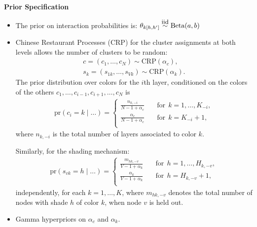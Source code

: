 \documentclass[a1,portrait,final]{a0poster}
\newenvironment{poster}{
  \begin{center}
  \begin{minipage}[c]{0.98\textwidth}
}{
  \end{minipage}
  \end{center}
}
\begin{document}
\begin{poster}
\begin{multicols}{2}
\vspace{0.2cm}

\begin{center}
\textbf{Prior Specification}
\end{center}

\begin{itemize}
 \item The prior on interaction probabilities is:
 $ \theta_{k[h,h']} \stackrel{{\small{\mbox{iid}}}}{\sim} \mbox{Beta}(a,b)$

 \vspace{.2cm}

 \item Chinese Restaurant Processes (CRP) for the cluster assignments at both levels allows the number of clusters to be random:
 \begin{align*}
c=(c_1,\ldots,c_N) \sim \mbox{CRP}(\alpha_c),\\
s_{k}=(s_{1k}, \ldots, s_{Vk})\sim \mbox{CRP}(\alpha_k).
\end{align*}
The prior distribution over colors for the $i$th layer, conditioned on the colors of the others $c_1,\ldots ,c_{i-1},c_{i+1}, \ldots, c_{N}$ is
\begin{eqnarray*}
\mbox{pr}(c_i=k \mid \ldots) = \begin{cases} \frac{n_{k,-i}}{N-1+\alpha_c} & \quad \text{for} \ \ k=1, \ldots, K_{-i}, \\ \frac{\alpha_c}{N-1+\alpha_c} & \quad \text{for} \ \ k=K_{-i}+1,\\ \end{cases} 
\end{eqnarray*}
where $n_{k,-i} $ is the total number of layers associated to color $k$. 

\vspace{.2cm}

Similarly, for the shading mechanism:
\begin{eqnarray*}
\mbox{pr}(s_{vk}=h \mid \ldots) = \begin{cases} \frac{m_{hk,-v}}{V-1+\alpha_k} & \quad \text{for} \ \ h=1, \ldots, H_{k,-v}, \\ \frac{\alpha_k}{V-1+\alpha_k} & \quad \text{for} \ \  h=H_{k,-v}+1,\\ \end{cases} 
 \label{shade}
\end{eqnarray*}
independently, for each $k=1, \ldots, K$, where $m_{hk,-v}$ denotes the total number of nodes with shade $h$ of color $k$, when node $v$ is held out.
\item Gamma hyperpriors on $\alpha_c$ and $\alpha_k$.
\end{itemize}


\end{multicols}
\end{poster}
\end{document}
